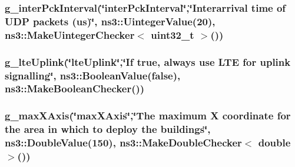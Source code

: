 \subsubsection[{\texorpdfstring{g\+\_\+inter\+Pck\+Interval}{g_interPckInterval}}]{ g\+\_\+inter\+Pck\+Interval(\char`\"{}inter\+Pck\+Interval\char`\"{},\char`\"{}Interarrival time of U\+DP packets (us)\char`\"{}, ns3\+::\+Uinteger\+Value(20), {\bf ns3\+::\+Make\+Uinteger\+Checker}$<$ uint32\+\_\+t $>$())\hspace{0.3cm}{\ttfamily [static]}}\hypertarget{mc-twoenbs_8cc_ab17a4b9687b84ef916bf3b1f093684c8}{}\label{mc-twoenbs_8cc_ab17a4b9687b84ef916bf3b1f093684c8}
\subsubsection[{\texorpdfstring{g\+\_\+lte\+Uplink}{g_lteUplink}}]{ g\+\_\+lte\+Uplink(\char`\"{}lte\+Uplink\char`\"{},\char`\"{}If true, always use L\+TE for uplink signalling\char`\"{}, ns3\+::\+Boolean\+Value({\bf false}), ns3\+::\+Make\+Boolean\+Checker())\hspace{0.3cm}{\ttfamily [static]}}\hypertarget{mc-twoenbs_8cc_a8417879f28bd5c81b6082047f6f9eb27}{}\label{mc-twoenbs_8cc_a8417879f28bd5c81b6082047f6f9eb27}
\subsubsection[{\texorpdfstring{g\+\_\+max\+X\+Axis}{g_maxXAxis}}]{ g\+\_\+max\+X\+Axis(\char`\"{}max\+X\+Axis\char`\"{},\char`\"{}The maximum X coordinate for the area in which to deploy the buildings\char`\"{}, ns3\+::\+Double\+Value(150), {\bf ns3\+::\+Make\+Double\+Checker}$<$ double $>$())\hspace{0.3cm}{\ttfamily [static]}}\hypertarget{mc-twoenbs_8cc_af3c84bb7021b65123942d41b00cc0e61}{}\label{mc-twoenbs_8cc_af3c84bb7021b65123942d41b00cc0e61}

